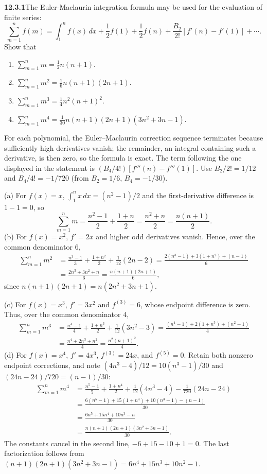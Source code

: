 \par\bigskip
\noindent\textbf{12.3.1}\quad The Euler-Maclaurin integration formula may be
used for the evaluation of finite series:
\[
\sum_{m=1}^{n}f(m)=\int_{1}^{n}f(x)\,dx+\frac{1}{2}f(1)+\frac{1}{2}f(n)
+\frac{B_{2}}{2!}\left[f'(n)-f'(1)\right]+\cdots.
\]
Show that
\begin{enumerate}
\item[(a)] $\displaystyle\sum_{m=1}^{n}m=\tfrac{1}{2}n(n+1)$.
\item[(b)] $\displaystyle\sum_{m=1}^{n}m^{2}=\tfrac{1}{6}n(n+1)(2n+1)$.
\item[(c)] $\displaystyle\sum_{m=1}^{n}m^{3}=\tfrac{1}{4}n^{2}(n+1)^{2}$.
\item[(d)] $\displaystyle\sum_{m=1}^{n}m^{4}
  =\tfrac{1}{30}n(n+1)(2n+1)(3n^{2}+3n-1)$.
\end{enumerate}
\solution
For each polynomial, the Euler--Maclaurin correction sequence terminates
because sufficiently high derivatives vanish; the remainder, an integral
containing such a derivative, is then zero, so the formula is exact. The
term following the one displayed in the statement is
$(B_4/4!)[f'''(n)-f'''(1)]$. Use $B_2/2!=1/12$ and $B_4/4!=-1/720$
(from $B_2=1/6$, $B_4=-1/30$).

(a) For $f(x)=x$, $\int_1^nx\,dx=(n^2-1)/2$ and the first-derivative
difference is $1-1=0$, so
\[
\sum_{m=1}^nm=\frac{n^2-1}{2}+\frac{1+n}{2}
=\frac{n^2+n}{2}=\boxed{\frac{n(n+1)}2}.
\]
(b) For $f(x)=x^2$, $f'=2x$ and higher odd derivatives vanish. Hence,
over the common denominator $6$,
\begin{align*}
\sum_{m=1}^nm^2
&=\frac{n^3-1}{3}+\frac{1+n^2}{2}+\frac1{12}(2n-2)
=\frac{2(n^3-1)+3(1+n^2)+(n-1)}{6}\\
&=\frac{2n^3+3n^2+n}{6}
=\boxed{\frac{n(n+1)(2n+1)}6},
\end{align*}
since $n(n+1)(2n+1)=n(2n^2+3n+1)$.

(c) For $f(x)=x^3$, $f'=3x^2$ and $f^{(3)}=6$, whose endpoint
difference is zero. Thus, over the common denominator $4$,
\begin{align*}
\sum_{m=1}^nm^3
&=\frac{n^4-1}{4}+\frac{1+n^3}{2}+\frac1{12}(3n^2-3)
=\frac{(n^4-1)+2(1+n^3)+(n^2-1)}{4}\\
&=\frac{n^4+2n^3+n^2}{4}
=\boxed{\frac{n^2(n+1)^2}{4}}.
\end{align*}
(d) For $f(x)=x^4$, $f'=4x^3$, $f^{(3)}=24x$, and $f^{(5)}=0$.
Retain both nonzero endpoint corrections, and note
$(4n^3-4)/12=10(n^3-1)/30$ and $(24n-24)/720=(n-1)/30$:
\begin{align*}
\sum_{m=1}^nm^4
&=\frac{n^5-1}{5}+\frac{1+n^4}{2}
 +\frac1{12}(4n^3-4)-\frac1{720}(24n-24)\\
&=\frac{6(n^5-1)+15(1+n^4)+10(n^3-1)-(n-1)}{30}\\
&=\frac{6n^5+15n^4+10n^3-n}{30}\\
&=\boxed{\frac{n(n+1)(2n+1)(3n^2+3n-1)}{30}}.
\end{align*}
The constants cancel in the second line, $-6+15-10+1=0$.
The last factorization follows from
$(n+1)(2n+1)(3n^2+3n-1)=6n^4+15n^3+10n^2-1$.

